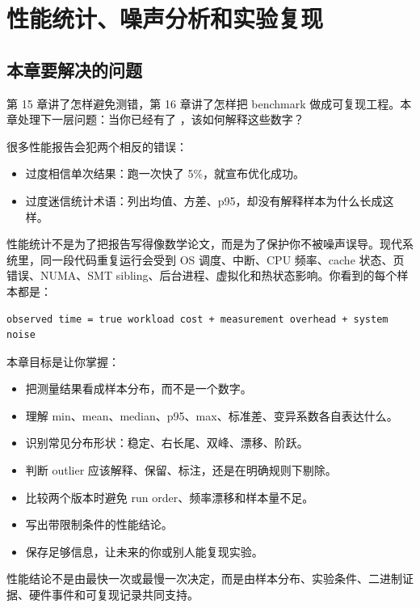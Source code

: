 \section{性能统计、噪声分析和实验复现}

\subsection{本章要解决的问题}

第 15 章讲了怎样避免测错，第 16 章讲了怎样把 benchmark 做成可复现工程。本章处理下一层问题：当你已经有了 ，该如何解释这些数字？

很多性能报告会犯两个相反的错误：

\begin{itemize}
  \item 过度相信单次结果：跑一次快了 5\%，就宣布优化成功。
  \item 过度迷信统计术语：列出均值、方差、p95，却没有解释样本为什么长成这样。
\end{itemize}

性能统计不是为了把报告写得像数学论文，而是为了保护你不被噪声误导。现代系统里，同一段代码重复运行会受到 OS 调度、中断、CPU 频率、cache 状态、页错误、NUMA、SMT sibling、后台进程、虚拟化和热状态影响。你看到的每个样本都是：

\begin{lstlisting}
observed time = true workload cost + measurement overhead + system noise
\end{lstlisting}

本章目标是让你掌握：

\begin{itemize}
  \item 把测量结果看成样本分布，而不是一个数字。
  \item 理解 min、mean、median、p95、max、标准差、变异系数各自表达什么。
  \item 识别常见分布形状：稳定、右长尾、双峰、漂移、阶跃。
  \item 判断 outlier 应该解释、保留、标注，还是在明确规则下剔除。
  \item 比较两个版本时避免 run order、频率漂移和样本量不足。
  \item 写出带限制条件的性能结论。
  \item 保存足够信息，让未来的你或别人能复现实验。
\end{itemize}

\begin{keyidea}
性能结论不是由最快一次或最慢一次决定，而是由样本分布、实验条件、二进制证据、硬件事件和可复现记录共同支持。
\end{keyidea}


